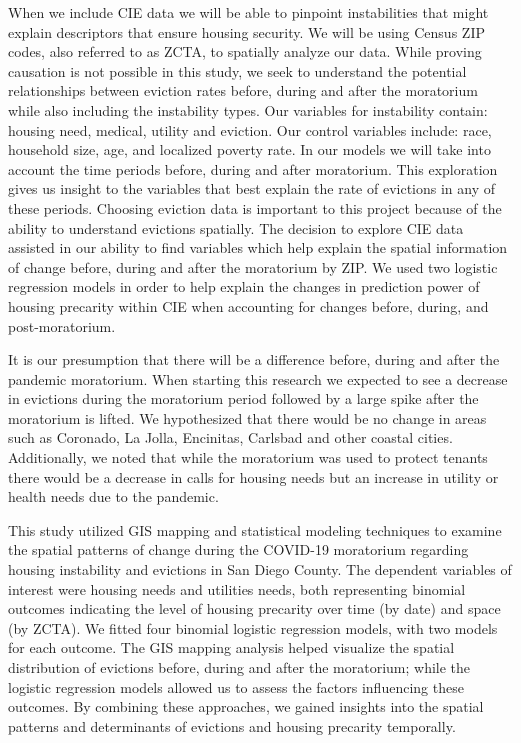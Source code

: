 \documentclass[man, 12pt, donotrepeattitle, floatsintext]{apa7} %
\begin{document}
When we include CIE data we will be able to pinpoint instabilities that might explain descriptors that ensure housing security. We will be using Census ZIP codes, also referred to as ZCTA, to spatially analyze our data. While proving causation is not possible in this study, we seek to understand the potential relationships between eviction rates before, during and after the moratorium while also including the instability types. Our variables for instability contain: housing need, medical, utility and eviction. Our control variables include: race, household size, age, and localized poverty rate. In our models we will take into account the time periods before, during and after moratorium. This exploration gives us insight to the variables that best explain the rate of evictions in any of these periods. Choosing eviction data is important to this project because of the ability to understand evictions spatially. The decision to explore CIE data assisted in our ability to find variables which help explain the spatial information of change before, during and after the moratorium by ZIP. We used two logistic regression models in order to help explain the changes in prediction power of housing precarity within CIE when accounting for changes before, during, and post-moratorium. 

It is our presumption that there will be a difference before, during and after the pandemic moratorium. When starting this research we expected to see a decrease in evictions during the moratorium period followed by a large spike after the moratorium is lifted. We hypothesized that there would be no change in areas such as Coronado, La Jolla, Encinitas, Carlsbad and other coastal cities. Additionally, we noted that while the moratorium was used to  protect tenants there would be a decrease in calls for housing needs but an increase in utility or health needs due to the pandemic.

This study utilized GIS mapping and statistical modeling techniques to examine the spatial patterns of change during the COVID-19 moratorium regarding housing instability and evictions in San Diego County. The dependent variables of interest were housing needs and utilities needs, both representing binomial outcomes indicating the level of housing precarity over time (by date) and space (by ZCTA). We fitted four binomial logistic regression models, with two models for each outcome. The GIS mapping analysis helped visualize the spatial distribution of evictions before, during and after the moratorium; while the logistic regression models allowed us to assess the factors influencing these outcomes. By combining these approaches, we gained insights into the spatial patterns and determinants of evictions and housing precarity temporally.
\end{document}
